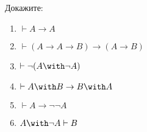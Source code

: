 \documentclass{article}
\begin{document}
\begin{enumerate}
    Докажите:
    \begin{enumerate}
    \item $\vdash A \rightarrow A$
    \item $\vdash (A \rightarrow A \rightarrow B) \rightarrow (A \rightarrow B)$
    \item $\vdash \neg (A \with \neg A)$
    \item $\vdash A \with B \rightarrow B \with A$
    \item $\vdash A \rightarrow \neg \neg A$
    \item $A \with \neg A \vdash B$
    \end{enumerate}

\end{enumerate}
\end{document}
